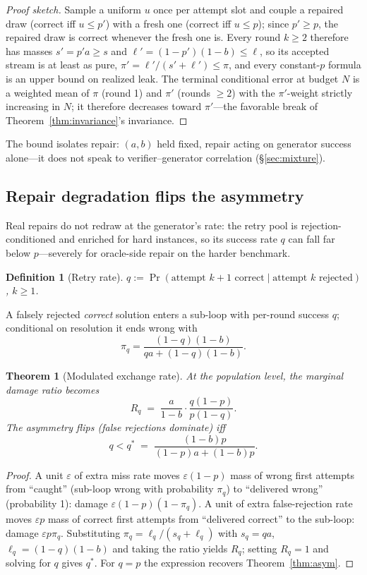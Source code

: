 \documentclass[10pt]{article}
\newtheorem{theorem}{Theorem}
\newtheorem{definition}{Definition}
\begin{document}
\begin{proof}[Proof sketch]
Sample a uniform $u$ once per attempt slot and couple a repaired
draw (correct iff $u \le p'$) with a fresh one (correct iff
$u \le p$); since $p' \ge p$, the repaired draw is correct whenever
the fresh one is.  Every round $k \ge 2$ therefore has masses
$s' = p'a \ge s$ and $\ell' = (1-p')(1-b) \le \ell$, so its
accepted stream is at least as pure,
$\pi' = \ell'/(s'+\ell') \le \pi$, and every constant-$p$ formula
is an upper bound on realized leak.  The terminal conditional
error at budget $N$ is a weighted mean of $\pi$ (round 1) and
$\pi'$ (rounds $\ge 2$) with the $\pi'$-weight strictly increasing
in $N$; it therefore decreases toward $\pi'$---the favorable break
of Theorem~\ref{thm:invariance}'s invariance.
\end{proof}

\noindent The bound isolates repair: $(a,b)$ held fixed, repair
acting on generator success alone---it does not speak to
verifier--generator correlation (§\ref{sec:mixture}).

\subsection{Repair degradation flips the asymmetry}\label{sec:degrade}

Real repairs do not redraw at the generator's rate: the retry
pool is rejection-conditioned and enriched for hard instances, so
its success rate $q$ can fall far below $p$---severely for
oracle-side repair on the harder benchmark.

\begin{definition}[Retry rate]\label{def:q}
$q := \Pr(\text{attempt } k{+}1 \text{ correct} \mid \text{attempt }
k \text{ rejected})$, $k \ge 1$.
\end{definition}

A falsely rejected \emph{correct} solution enters a sub-loop with
per-round success $q$; conditional on resolution it ends wrong with
\[
\pi_q = \frac{(1-q)(1-b)}{qa + (1-q)(1-b)}.
\]

\begin{theorem}[Modulated exchange rate]\label{thm:flip}
At the population level, the marginal damage ratio becomes
\[
R_q \;=\; \frac{a}{1-b}\cdot\frac{q(1-p)}{p(1-q)}.
\]
The asymmetry \emph{flips} (false rejections dominate) iff
\[
q < q^\ast \;=\; \frac{(1-b)p}{(1-p)a + (1-b)p}.
\]
\end{theorem}

\begin{proof}
A unit $\varepsilon$ of extra miss rate moves $\varepsilon(1-p)$
mass of wrong first attempts from ``caught'' (sub-loop wrong with
probability $\pi_q$) to ``delivered wrong'' (probability 1):
damage $\varepsilon(1-p)(1-\pi_q)$.  A unit of extra false-rejection
rate moves $\varepsilon p$ mass of correct first attempts from
``delivered correct'' to the sub-loop: damage $\varepsilon p \pi_q$.
Substituting $\pi_q = \ell_q/(s_q+\ell_q)$ with $s_q = qa$,
$\ell_q = (1-q)(1-b)$ and taking the ratio yields $R_q$; setting
$R_q = 1$ and solving for $q$ gives $q^\ast$.  For $q=p$ the
expression recovers Theorem~\ref{thm:asym}.
\end{proof}
\end{document}
